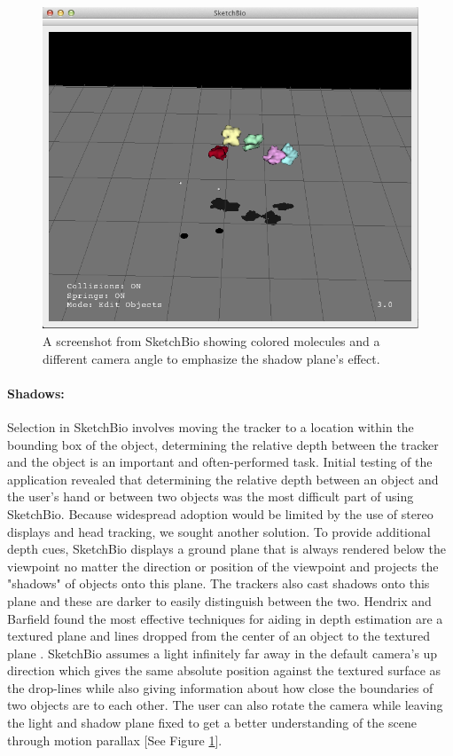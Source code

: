\documentclass[twocolumn]{bmcart}%
\begin{document}
\begin{figure}[h]
\centering
\includegraphics[width=0.9\columnwidth]{shadow_plane.png}
\caption{A screenshot from SketchBio showing colored molecules and a different camera angle to emphasize the shadow plane's effect.}
\label{fig:shadow_plane}
\end{figure}

\paragraph*{Shadows:}
Selection in SketchBio involves moving the tracker to a location within the bounding box of the object, determining the relative depth between the tracker and the object is an important and often-performed task.  Initial testing of the application revealed that determining the relative depth between an object and the user's hand or between two objects was the most difficult part of using SketchBio.  Because widespread adoption would be limited by the use of stereo displays and head tracking, we sought another solution.  To provide additional depth cues, SketchBio displays a ground plane that is always rendered below the viewpoint no matter the direction or position of the viewpoint and projects the "shadows" of objects onto this plane.  The trackers also cast shadows onto this plane and these are darker to easily distinguish between the two.  Hendrix and Barfield found the most effective techniques for aiding in depth estimation are a textured plane and lines dropped from the center of an object to the textured plane \cite{Hendrix1995103}.  SketchBio assumes a light infinitely far away in the default camera's up direction which gives the same absolute position against the textured surface as the drop-lines while also giving information about how close the boundaries of two objects are to each other.  The user can also rotate the camera while leaving the light and shadow plane fixed to get a better understanding of the scene through motion parallax [See Figure \ref{fig:shadow_plane}].
\end{document}
